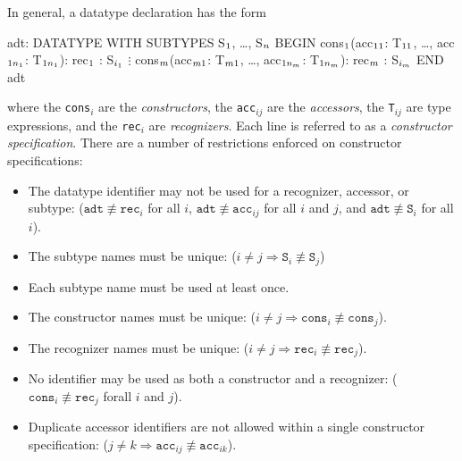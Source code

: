 In general, a datatype declaration has the form
\begin{pvsex}
  adt: DATATYPE WITH SUBTYPES S\(\sb{1}\), \ldots, S\(\sb{n}\)
    BEGIN
     cons\(\sb1\)(acc\(\sb{11}\): T\(\sb{11}\), \ldots, acc\(\sb{1{n\sb1}}\): T\(\sb{1{n\sb1}}\)): rec\(\sb1\) : S\(\sb{i\sb{1}}\)
     \(\vdots\)
     cons\(\sb{m}\)(acc\(\sb{m1}\): T\(\sb{m1}\), \ldots, acc\(\sb{1n\sb{m}}\): T\(\sb{1n\sb{m}}\)): rec\(\sb{m}\) : S\(\sb{i\sb{m}}\)
    END adt
\end{pvsex}
%
where the \texttt{cons$_i$} are the
\emph{constructors}, the
\texttt{acc$_{ij}$} are the
\emph{accessors}, the
\texttt{T$_{ij}$} are type expressions, and the \texttt{rec$_i$} are
\emph{recognizers}.  Each
line is referred to as a \emph{constructor
specification}.  There are a number of restrictions enforced on
constructor specifications:
\begin{itemize}

\item The datatype identifier may not be used for a recognizer,
accessor, or subtype:\newline
($\texttt{adt} \not\equiv \texttt{rec}_i$ for all $i$, $\texttt{adt}
\not\equiv \texttt{acc}_{ij}$ for all $i$ and $j$, and $\texttt{adt}
\not\equiv \texttt{S}_i$ for all $i$).

\item The subtype names must be unique:
($i \neq j \Rightarrow \texttt{S}_i \not\equiv \texttt{S}_j$)

\item Each subtype name must be used at least once.

\item The constructor names must be unique:
($i \neq j \Rightarrow \texttt{cons}_i \not\equiv \texttt{cons}_j$).

\item The recognizer names must be unique:
($i \neq j \Rightarrow \texttt{rec}_i \not\equiv \texttt{rec}_j$).

\item No identifier may be used as both a constructor and a recognizer:\newline
($\texttt{cons}_i \not\equiv \texttt{rec}_j$ forall $i$ and $j$).

\item Duplicate accessor identifiers are not allowed within a single
constructor specification:
($j \neq k \Rightarrow \texttt{acc}_{ij} \not\equiv \texttt{acc}_{ik}$).

\end{itemize}

